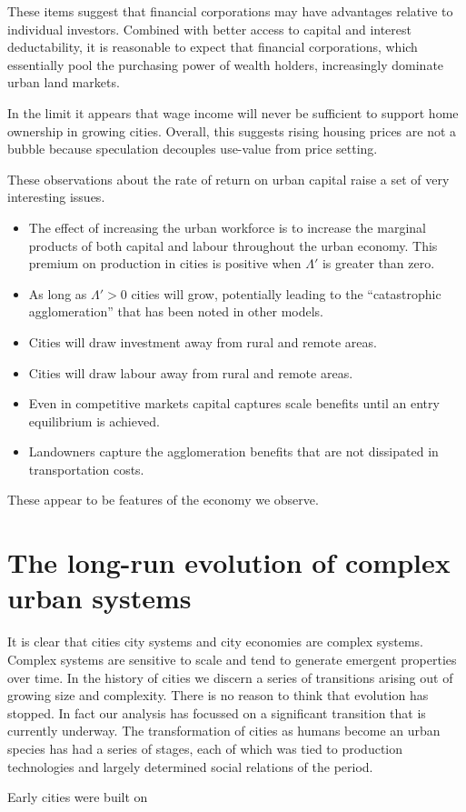 These items suggest that financial corporations may have advantages relative to individual investors. Combined with better access to capital and interest deductability, it is reasonable to expect that financial corporations, which essentially pool the purchasing power of wealth holders, increasingly dominate urban land markets. %

In the limit it appears that wage income will never be sufficient to support home ownership in growing cities. 
Overall, this suggests rising housing prices are not a bubble because speculation decouples use-value from price setting. %


These observations about  the rate of return on urban capital raise a set of very interesting issues.  


\begin{itemize}
\item The effect of increasing the urban workforce is to increase the marginal products of  both capital and labour throughout the urban economy. This premium on production in cities is positive when $\Lambda'$ is greater than zero.
 \item  As long as $\Lambda'>0$ cities will  grow, potentially leading to the ``catastrophic agglomeration''  that has been noted in other models.  %
\item Cities will draw investment away from rural and remote areas.
\item Cities will draw labour away from rural and remote areas. 
\item Even in competitive markets capital captures  scale benefits until an entry equilibrium is achieved.
\item Landowners  capture the agglomeration benefits that are not dissipated in transportation costs.
\end{itemize}

These appear to be features of the economy we observe.


\section{The long-run evolution of complex urban systems}

It is clear that cities city systems and city economies are complex systems. Complex systems are sensitive to scale and tend to generate emergent properties over time. In the history of cities we discern a series of transitions arising out of growing size and complexity. There is no reason to  think that evolution has stopped. In fact our analysis has focussed on a significant transition that is currently underway. The transformation of cities as humans become an urban species has had a series of stages, each of which was tied to production technologies and largely determined social relations of the period.

Early cities were built on 
 




